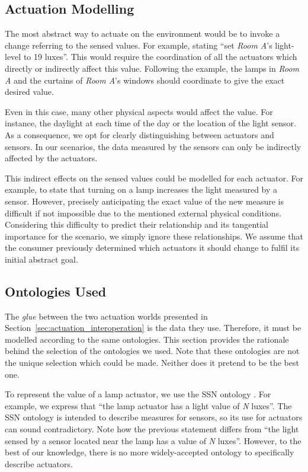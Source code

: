 \subsection{Actuation Modelling}

The most abstract way to actuate on the environment would be to invoke a change referring to the sensed values.
For example, stating ``set \emph{Room A}'s light-level to 19 luxes''.
This would require the coordination of all the actuators which directly or indirectly affect this value.
Following the example, the lamps in \emph{Room A} and the curtains of \emph{Room A}'s windows should coordinate to give the exact desired value.


Even in this case, many other physical aspects would affect the value.
For instance, the daylight at each time of the day or the location of the light sensor.
As a consequence, we opt for clearly distinguishing between actuators and sensors.
In our scenarios, the data measured by the sensors can only be indirectly affected by the actuators.


This indirect effects on the sensed values could be modelled for each actuator.
For example, to state that turning on a lamp increases the light measured by a sensor.
However, precisely anticipating the exact value of the new measure is difficult if not impossible due to the mentioned external physical conditions.
Considering this difficulty to predict their relationship and its tangential importance for the scenario, we simply ignore these relationships.
We assume that the consumer previously determined which actuators it should change to fulfil its initial abstract goal.


\subsection{Ontologies Used}

The \emph{glue} between the two actuation worlds presented in Section~\ref{sec:actuation_interoperation} is the data they use. %
Therefore, it must be modelled according to the same ontologies.
This section provides the rationale behind the selection of the ontologies we used.
Note that these ontologies are not the unique selection which could be made.
Neither does it pretend to be the best one.


To represent the value of a lamp actuator, we use the SSN ontology .
For example, we express that ``the lamp actuator has a light value of \emph{N} luxes''.
The SSN ontology is intended to describe measures for sensors, so its use for actuators can sound contradictory.
Note how the previous statement differs from ``the light sensed by a sensor located near the lamp has a value of \emph{N} luxes''.
However, to the best of our knowledge, there is no more widely-accepted ontology to specifically describe actuators.


